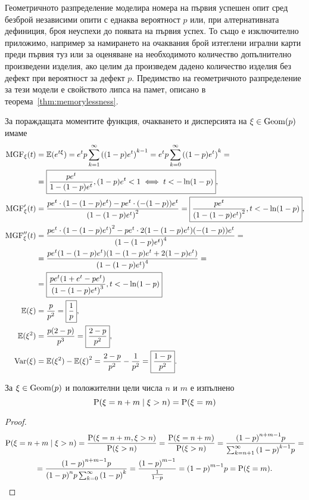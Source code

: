 \documentclass[numbers=endperiod, DIV=15, bibliography=totocnumbered]{scrartcl}
\begin{document}
Геометричното разпределение моделира номера на първия успешен опит сред безброй независими опити с еднаква вероятност $p$ или, при алтернативната дефиниция, броя неуспехи до появата на първия успех. То също е изключително приложимо, например за намирането на очаквания брой изтеглени игрални карти преди първия туз или за оценяване на необходимото количество допълнително произведени изделия, ако целим да произведем дадено количество изделия без дефект при вероятност за дефект $p$. Предимство на геометричното разпределение за тези модели е свойството липса на памет, описано в теорема~\ref{thm:memorylessness}.

За пораждащата моментите функция, очакването и дисперсията на $\xi \in \operatorname{Geom}(p)$ имаме
\begingroup
\allowdisplaybreaks
\begin{align*}
  \operatorname{MGF}_\xi(t)
  &=
  \mathbb{E}(e^{t\xi})
  =
  e^t p \sum_{k=1}^\infty {((1-p) e^t)}^{k-1}
  =
  e^t p \sum_{k=0}^\infty {((1-p) e^t)}^k
  = \\ &=
  \boxed{\frac {p e^t} {1 - (1-p) e^t}, (1-p) e^t < 1 \iff t < -\ln(1-p)},
  \\
  \operatorname{MGF}'_\xi(t)
  &=
  \frac {p e^t \cdot (1 - (1-p) e^t) - p e^t \cdot (-(1-p)) e^t} {{(1 - (1-p) e^t)}^2}
  =
  \boxed{\frac {p e^t} {{(1 - (1-p) e^t)}^2}, t < -\ln(1-p)},
  \\
  \operatorname{MGF}''_\xi(t)
  &=
  \frac {p e^t \cdot {(1 - (1-p) e^t)}^2 - p e^t \cdot 2 (1 - (1-p) e^t) (-(1-p)) e^t} {{(1 - (1-p) e^t)}^4}
  = \\ &=
  \frac {p e^t (1 - (1-p) e^t) (1 - (1-p) e^t + 2 (1-p) e^t)} {{(1 - (1-p) e^t)}^4}
  = \\ &=
  \boxed{\frac {p e^t (1 + e^t - p e^t)} {{(1 - (1-p) e^t)}^3}, t < -\ln(1-p)}
  \\
  \mathbb{E}(\xi)
  &=
  \frac p {p^2}
  =
  \boxed{\frac 1 p},
  \\
  \mathbb{E}(\xi^2)
  &=
  \frac {p(2-p)} {p^3}
  =
  \boxed{\frac {2-p} {p^2}},
  \\
  \operatorname{Var}(\xi)
  &=
  \mathbb{E}(\xi^2) - {\mathbb{E}(\xi)}^2
  =
  \frac {2-p} {p^2} - \frac 1 {p^2}
  =
  \boxed{\frac {1-p} {p^2}}.
\end{align*}
\endgroup

\begin{theorem}\label{thm:memorylessness}
  За $\xi \in \operatorname{Geom}(p)$ и положителни цели числа $n$ и $m$ е изпълнено
  \begin{displaymath}
    \operatorname{P}(\xi = n + m \mid \xi > n) = \operatorname{P}(\xi = m)
  \end{displaymath}
\end{theorem}
\begin{proof}
  \begin{multline*}
    \operatorname{P}(\xi = n + m \mid \xi > n)
    =
    \frac {\operatorname{P}(\xi = n + m, \xi > n)} {\operatorname{P}(\xi > n)}
    =
    \frac {\operatorname{P}(\xi = n + m)} {\operatorname{P}(\xi > n)}
    =
    \frac {{(1-p)}^{n+m-1} p} {\sum_{k=n+1}^\infty {(1-p)}^{k-1} p}
    = \\ =
    \frac {{(1-p)}^{n+m-1} p} {{(1-p)}^n p \sum_{k=0}^\infty {(1-p)}^k}
    =
    \frac {{(1-p)}^{m-1}} {\frac 1 {1 - p}}
    =
    {(1-p)}^{m-1} p
    =
    \operatorname{P}(\xi = m).
  \end{multline*}
\end{proof}
\end{document}
